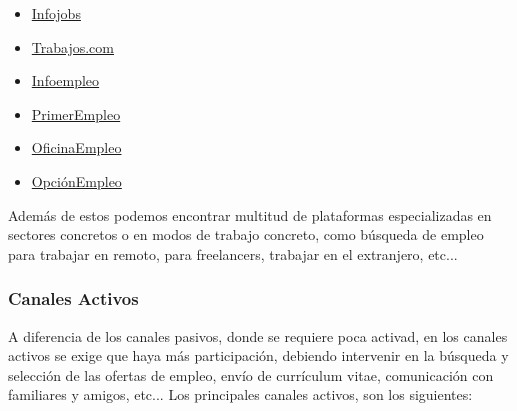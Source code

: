\begin{itemize}
    \begin{itemize}
        \item \href{https://www.infojobs.net/}{Infojobs}
        \item \href{https://www.trabajos.com/}{Trabajos.com}
        \item \href{https://www.infoempleo.com/}{Infoempleo}
        \item \href{https://www.primerempleo.com/}{PrimerEmpleo}
        \item \href{https://www.oficinaempleo.com/}{OficinaEmpleo}
        \item \href{https://www.opcionempleo.com/}{OpciónEmpleo}
    \end{itemize}
\end{itemize}

Además de estos podemos encontrar multitud de plataformas especializadas en sectores concretos o en modos de trabajo concreto, como búsqueda de empleo para trabajar en remoto, para freelancers, trabajar en el extranjero, etc...

\subsubsection*{Canales Activos}
A diferencia de los canales pasivos, donde se requiere poca activad, en los canales activos se exige que haya más participación, debiendo intervenir en la búsqueda y selección de las ofertas de empleo, envío de currículum vitae, comunicación con familiares y amigos, etc... Los principales canales activos, son los siguientes:

